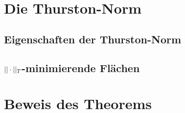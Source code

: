 
\section{Die Thurston-Norm}

	\subsection{Eigenschaften der Thurston-Norm}
	\subsection{$||\cdot||_T$-minimierende Flächen}
	\section{Beweis des Theorems}
	    